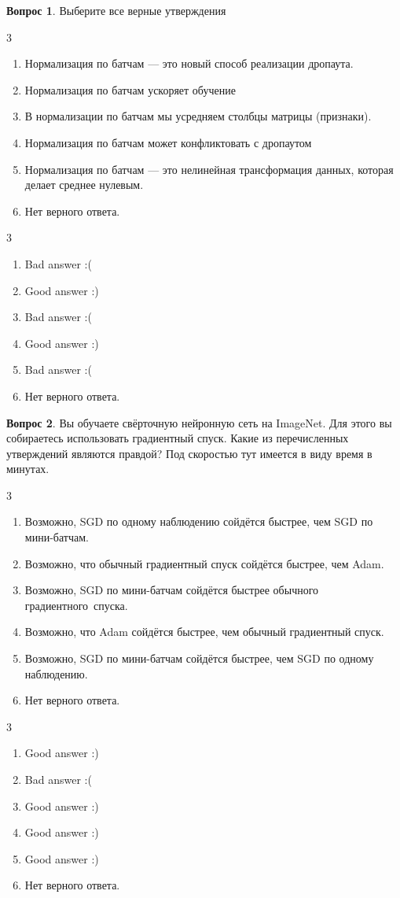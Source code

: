 \documentclass[12pt]{article}
\newenvironment{answerlist}[1][3]{
\begin{multicols}{#1}

\begin{enumerate}[label=\fbox{\emph{\Alph*}},ref=\emph{\alph*}]
}
{
\item Нет верного ответа.
\end{enumerate}
\end{multicols}
}
\theoremstyle{definition}
\newtheorem{question}{Вопрос}
\begin{document}
 
\begin{question}
Выберите все верные утверждения
\begin{answerlist}
  \item Нормализация по батчам --- это новый способ реализации дропаута.
  \item Нормализация по батчам ускоряет обучение
  \item В нормализации по батчам мы усредняем столбцы матрицы (признаки). 
  \item Нормализация по батчам может конфликтовать с дропаутом
  \item Нормализация по батчам --- это нелинейная трансформация данных, которая делает среднее нулевым. 
\end{answerlist}
\end{question}
\begin{solution}
\begin{answerlist}
  \item Bad answer :(
  \item Good answer :)
  \item Bad answer :(
  \item Good answer :)
  \item Bad answer :(
\end{answerlist}
\end{solution}


\begin{question}
Вы обучаете свёрточную нейронную сеть на ImageNet. Для этого вы собираетесь использовать градиентный спуск. Какие из перечисленных утверждений являются правдой? Под скоростью тут имеется в виду время в минутах. 
\begin{answerlist}
  \item Возможно, SGD по одному наблюдению сойдётся быстрее, чем SGD по мини-батчам.
  \item Возможно, что обычный градиентный спуск сойдётся быстрее, чем Adam. 
  \item Возможно, SGD по мини-батчам сойдётся быстрее обычного градиентного~спуска.
  \item Возможно, что Adam сойдётся быстрее, чем обычный градиентный спуск.
  \item Возможно, SGD по мини-батчам сойдётся быстрее, чем SGD по одному наблюдению.
\end{answerlist}
\end{question}

\begin{solution}
\begin{answerlist}
  \item Good answer :)
  \item Bad answer :(
  \item Good answer :)
  \item Good answer :)
  \item Good answer :)
\end{answerlist}
\end{solution}
\end{document}
